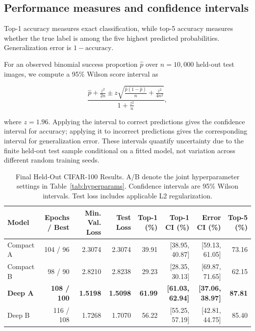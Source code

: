 \documentclass[conference]{IEEEtran}
\begin{document}
\subsection{Performance measures and confidence intervals}

Top-1 accuracy measures exact classification, while top-5 accuracy measures whether the true label is among the five highest predicted probabilities. Generalization error is $1-\text{accuracy}$.

For an observed binomial success proportion $\hat{p}$ over $n=10,000$ held-out test images, we compute a 95\% Wilson score interval as

\begin{equation}
\frac{
\hat{p}+\frac{z^2}{2n}
\pm
z\sqrt{
\frac{\hat{p}(1-\hat{p})}{n}
+
\frac{z^2}{4n^2}
}
}{
1+\frac{z^2}{n}
},
\end{equation}

where $z=1.96$. Applying the interval to correct predictions gives the confidence interval for accuracy; applying it to incorrect predictions gives the corresponding interval for generalization error. These intervals quantify uncertainty due to the finite held-out test sample conditional on a fitted model, not variation across different random training seeds.

\begin{table}[!t]
\caption{Final Held-Out CIFAR-100 Results. A/B denote the joint hyperparameter settings in Table~\ref{tab:hyperparams}. Confidence intervals are 95\% Wilson intervals. Test loss includes applicable L2 regularization.}
\label{tab:results}
\centering
\small
\setlength{\tabcolsep}{4.5pt}
\begin{tabular}{lrrrrrrr}
\toprule
Model &
Epochs / Best &
Min. Val. Loss &
Test Loss &
Top-1 (\%) &
Top-1 CI (\%) &
Error CI (\%) &
Top-5 (\%) \\
\midrule

Compact A
& 104 / 96
& 2.3074
& 2.3074
& 39.91
& [38.95, 40.87]
& [59.13, 61.05]
& 73.16 \\

Compact B
& 98 / 90
& 2.8210
& 2.8238
& 29.23
& [28.35, 30.13]
& [69.87, 71.65]
& 62.15 \\

\textbf{Deep A}
& \textbf{108 / 100}
& \textbf{1.5198}
& \textbf{1.5098}
& \textbf{61.99}
& \textbf{[61.03, 62.94]}
& \textbf{[37.06, 38.97]}
& \textbf{87.81} \\

Deep B
& 116 / 108
& 1.7268
& 1.7070
& 56.22
& [55.25, 57.19]
& [42.81, 44.75]
& 85.40 \\

\bottomrule
\end{tabular}
\end{table}
\end{document}
